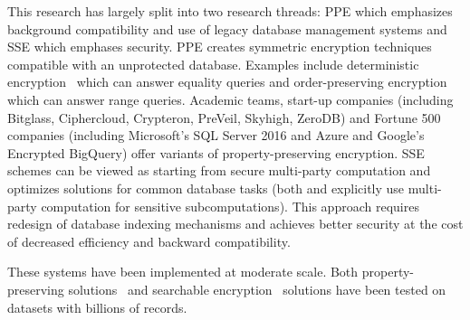 This research has largely split into two research threads: PPE which emphasizes background compatibility and use of legacy database management systems and SSE which emphases security.  PPE creates symmetric encryption techniques
compatible with an unprotected database. Examples include deterministic
encryption~\cite{C:BelBolONe07} which can answer equality queries and order-preserving encryption~\cite{C:BolCheONe11,EC:BCLO09}
which can answer range queries. Academic teams, start-up companies (including Bitglass, Ciphercloud, Crypteron, PreVeil, Skyhigh, ZeroDB) and Fortune
500 companies (including Microsoft's SQL Server 2016 and Azure and Google's Encrypted BigQuery)  offer variants of property-preserving encryption.
%
SSE schemes can be viewed as starting from secure multi-party computation and
optimizes solutions for common database tasks (both \cite{SP:FVKKKM15} and \cite{RSA:IKLO16} explicitly use multi-party computation for sensitive subcomputations). This approach requires redesign
of database indexing mechanisms and achieves better security at the cost of decreased efficiency and backward compatibility. 

These systems have been implemented at moderate scale.  Both property-preserving solutions~\cite{CACM:PRZB12,EPRINT:PodBoePop16} and searchable encryption~\cite{SP:PKVKMC14,SP:FVKKKM15,C:CJJKRS13,CCS:JJKRS13,NDSS:CJJJKR14,ESORICS:FJKNRS15,RSA:IKLO16} solutions have been tested on datasets with billions of records.

%


